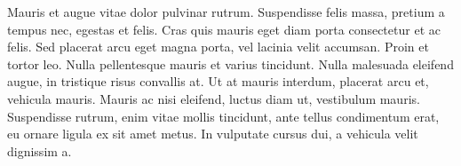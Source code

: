 Mauris et augue vitae dolor pulvinar rutrum. Suspendisse felis massa, pretium a tempus nec, egestas et felis. Cras quis mauris eget diam porta consectetur et ac felis. Sed placerat arcu eget magna porta, vel lacinia velit accumsan. Proin et tortor leo. Nulla pellentesque mauris et varius tincidunt. Nulla malesuada eleifend augue, in tristique risus convallis at. Ut at mauris interdum, placerat arcu et, vehicula mauris. Mauris ac nisi eleifend, luctus diam ut, vestibulum mauris. Suspendisse rutrum, enim vitae mollis tincidunt, ante tellus condimentum erat, eu ornare ligula ex sit amet metus. In vulputate cursus dui, a vehicula velit dignissim a.


